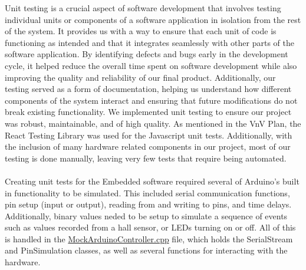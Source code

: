 \documentclass[12pt, titlepage]{article}
\begin{document}
  Unit testing is a crucial aspect of software development that involves testing 
  individual units or components of a software application in isolation from the 
  rest of the system. It provides us with a way to ensure that each unit of code 
  is functioning as intended and that it integrates seamlessly with other parts 
  of the software application. By identifying defects and bugs early in the 
  development cycle, it helped reduce the overall time spent on software 
  development while also improving the quality and reliability of our final 
  product. Additionally, our testing served as a form of documentation, helping us 
  understand how different components of the system  interact and
   ensuring that future modifications do not break existing functionality. We 
   implemented unit testing to ensure our project was robust, maintainable, 
   and of high quality. As mentioned in the VnV Plan, the React Testing Library 
   was used for the Javascript unit tests. Additionally, with the inclusion of 
   many hardware related components in our project, most of our testing is done 
   manually, leaving very few tests that require being automated. 
  \\\\
  Creating unit tests for the Embedded software required several of Arduino's built in functionality to be simulated. This included serial communication functions,
  pin setup (input or output), reading from and writing to pins, and time delays. Additionally, binary values neded to be setup to simulate a sequence of events 
  such as values recorded from a hall sensor, or LEDs turning on or off. All of this is handled in the 
  \href{../../test/EmbeddedTest/ArduinoTest/MockArduinoController.cpp}{MockArduinoController.cpp} file, which holds the SerialStream and PinSimulation classes,
  as well as several functions for interacting with the hardware.
\end{document}
